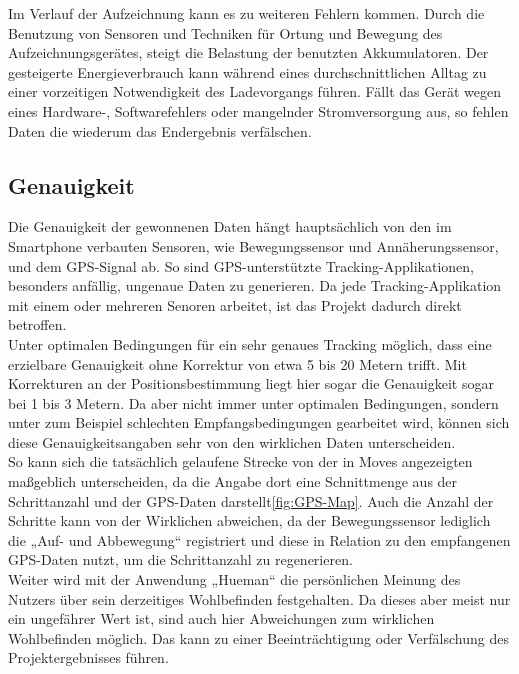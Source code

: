 Im Verlauf der Aufzeichnung kann es zu weiteren Fehlern kommen.
Durch die Benutzung von Sensoren und Techniken für Ortung und Bewegung des Aufzeichnungsgerätes, steigt die Belastung der benutzten Akkumulatoren.
Der gesteigerte Energieverbrauch kann während eines durchschnittlichen Alltag zu einer vorzeitigen Notwendigkeit des Ladevorgangs führen.
Fällt das Gerät wegen eines Hardware-, Softwarefehlers oder mangelnder Stromversorgung aus, so fehlen Daten die wiederum das Endergebnis verfälschen.

\subsection{Genauigkeit}
\label{ch:Relativierung:sec:SystematischeUndZufälligeFehler:subsec:Genauigkeit}

Die Genauigkeit der gewonnenen Daten hängt hauptsächlich von den im Smartphone verbauten Sensoren, wie Bewegungssensor und Annäherungssensor, und  dem GPS-Signal ab.
So sind GPS-unterstützte Tracking-Applikationen, besonders  anfällig, ungenaue Daten zu generieren.
Da jede Tracking-Applikation mit einem oder mehreren Senoren arbeitet, ist das Projekt dadurch direkt betroffen. \\
Unter optimalen Bedingungen für ein sehr genaues Tracking möglich, dass eine erzielbare Genauigkeit ohne Korrektur von etwa 5 bis 20 Metern trifft. 
Mit Korrekturen an der Positionsbestimmung liegt hier sogar die Genauigkeit sogar bei 1 bis 3 Metern\cite{web:GPS}. 
Da aber nicht immer unter optimalen Bedingungen, sondern unter zum Beispiel schlechten Empfangsbedingungen gearbeitet wird, können sich diese Genauigkeitsangaben sehr von den wirklichen Daten unterscheiden.  \\
So kann sich die tatsächlich gelaufene Strecke von der in Moves angezeigten maßgeblich unterscheiden, da die Angabe dort eine Schnittmenge aus der Schrittanzahl und der GPS-Daten darstellt\ref{fig:GPS-Map}.
Auch die Anzahl der Schritte kann von der Wirklichen abweichen, da der Bewegungssensor lediglich die „Auf- und Abbewegung“ registriert und diese in Relation zu den empfangenen GPS-Daten nutzt, um die Schrittanzahl zu regenerieren.\\
Weiter wird mit der Anwendung „Hueman“ die persönlichen Meinung des Nutzers über sein derzeitiges Wohlbefinden festgehalten. 
Da dieses aber meist nur ein ungefährer Wert ist, sind auch hier Abweichungen zum wirklichen Wohlbefinden möglich.
Das kann zu einer Beeinträchtigung oder Verfälschung des Projektergebnisses führen.

